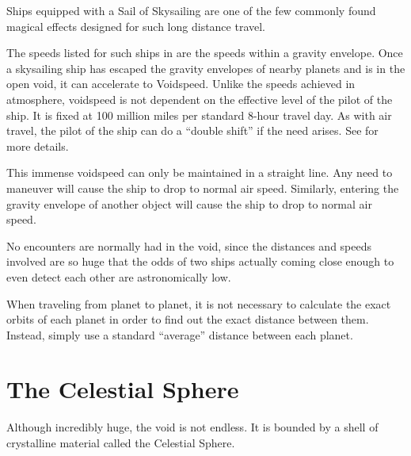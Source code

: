 \begin{multicols*}{2}
Ships equipped with a Sail of Skysailing are one of the few commonly found magical effects designed for such long distance travel.

The speeds listed for such ships in  are the speeds within a gravity envelope. Once a skysailing ship has escaped the gravity envelopes of nearby planets and is in the open void, it can accelerate to Voidspeed. Unlike the speeds achieved in atmosphere, voidspeed is not dependent on the effective level of the pilot of the ship. It is fixed at 100 million miles per standard 8-hour travel day. As with air travel, the pilot of the ship can do a “double shift” if the need arises. See  for more details.

This immense voidspeed can only be maintained in a straight line. Any need to maneuver will cause the ship to drop to normal air speed. Similarly, entering the gravity envelope of another object will cause the ship to drop to normal air speed.

No encounters are normally had in the void, since the distances and speeds involved are so huge that the odds of two ships actually coming close enough to even detect each other are astronomically low.

When traveling from planet to planet, it is not necessary to calculate the exact orbits of each planet in order to find out the exact distance between them. Instead, simply use a standard “average” distance between each planet.


\section{The Celestial Sphere}\label{sec:The Celestial Sphere}
Although incredibly huge, the void is not endless. It is bounded by a shell of crystalline material called the Celestial Sphere.


\end{multicols*}
